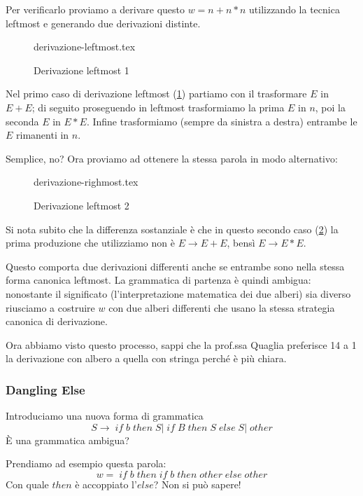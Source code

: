 \documentclass[class=book, crop=false, oneside, 12pt]{standalone}
\begin{document}
Per verificarlo proviamo a derivare questo \(w = n+n*n\) utilizzando la tecnica leftmost e generando due derivazioni distinte.

\begin{figure}[H]
	\centering
	{derivazione-leftmost.tex}
    \caption{Derivazione leftmost 1}
    \label{leftmost_1}
\end{figure}
Nel primo caso di derivazione leftmost (\ref{leftmost_1}) partiamo con il trasformare \(E\) in \(E+E\); di seguito proseguendo in leftmost trasformiamo la prima \(E\) in \(n\), poi la seconda \(E\) in \(E*E\).
Infine trasformiamo (sempre da sinistra a destra) entrambe le \(E\) rimanenti in \(n\).

Semplice, no? Ora proviamo ad ottenere la stessa parola in modo alternativo:
\begin{figure}[H]
	\centering
	{derivazione-righmost.tex}
    \caption{Derivazione leftmost 2}
    \label{leftmost_2}
\end{figure}
Si nota subito che la differenza sostanziale è che in questo secondo caso (\ref{leftmost_2}) la prima produzione che utilizziamo non è \(E \to E+E\), bensì \(E \to E*E\).

Questo comporta due derivazioni differenti anche se entrambe sono nella stessa forma canonica leftmost.
La grammatica di partenza è quindi ambigua: nonostante il significato (l'interpretazione matematica dei due alberi) sia diverso riusciamo a costruire \(w\) con due alberi differenti che usano la stessa strategia canonica di derivazione.

Ora abbiamo visto questo processo, sappi che la prof.ssa Quaglia preferisce 14 a 1 la derivazione con albero a quella con stringa perché è più chiara.

\subsubsection*{Dangling Else}
Introduciamo una nuova forma di grammatica
\begin{equation}
    S \to \; if \; b \; then \; S |\; if\; B\; then\; S\; else\; S |\; other
\end{equation}
È una grammatica ambigua?

Prendiamo ad esempio questa parola:
\begin{equation}
    \label{dangling_else}
    w =\; if\; b\; then\; if\; b\; then\; other\; else\; other
\end{equation}
Con quale \(then\) è accoppiato l’\(else\)? Non si può sapere!
\end{document}
